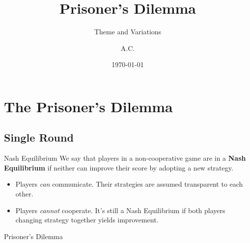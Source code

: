 \documentclass[pdf]{beamer}
\title{Prisoner's Dilemma}
\subtitle{Theme and Variations}
\author{A.C.}
\date{\today}
\begin{document}
\begin{frame}
  \titlepage
\end{frame}

\section{The Prisoner's Dilemma}
\subsection{Single Round}
\begin{frame}{Nash Equilibrium}
  We say that players in a non-cooperative game are in a \textbf{Nash Equilibrium}
  if neither can improve their score by adopting a new strategy.
  \begin{itemize}
  \pause\item Players \emph{can} communicate. Their strategies are assumed transparent
    to each other.
  \pause\item Players \emph{cannot} cooperate. It's still a Nash Equilibrium if both
    players changing strategy together yields improvement.
  \end{itemize}
\end{frame}

\begin{frame}{Prisoner's Dilemma}

\end{frame}
\end{document}
